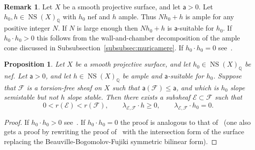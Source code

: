 \documentclass[11pt]{amsart}
\newcommand{\QQ}{{\mathbb Q}}
\let\mathcal\mathscr
\def\cE{\mathcal{E}}
\def\cF{\mathcal{F}}
\DeclareMathOperator{\NS}{NS}
\newtheorem{prp}[lmm]{Proposition}
\theoremstyle{definition}
\newtheorem{rmk}[lmm]{Remark}
\theoremstyle{remark}
\begin{document}
%
\begin{rmk}\label{rmk:fratelli}
%
   Let $X$ be a smooth projective surface, and let ${\mathsf a}> 0$. 
Let $h_0,h\in\NS(X)_{\QQ}$ with $h_0$ nef and $h$ ample. Thus $Nh_0+h$ is ample for any positive integer $N$. 
If $N$ is large enough  then $Nh_0+h$ is ${\mathsf a}$-suitable for $h_0$.  If $h_0\cdot h_0>0$ this follows from the wall-and-chamber decomposition of the ample cone 
 discussed in Subsubsection~\ref{subsubsec:muricamere}. If $h_0\cdot h_0=0$ see~\cite[Lemma~2.3]{friedman-rk2-ell}.
%
\end{rmk}
%
%
\begin{prp}\label{prp:paragonestab}
%
Let $X$ be a smooth projective surface, and let  $h_0\in\NS(X)_{\QQ}$ be  nef. 
Let  ${\mathsf a}> 0$, and let $h\in\NS(X)_{\QQ}$  be  ample and ${\mathsf a}$-suitable for $h_0$. 
 Suppose that  $\cF$ is  a torsion-free  sheaf on $X$ such that  
   ${\mathsf a}(\cF)\le {\mathsf a}$, and   which  is
  $h_0$ slope semistable  but not $h$ slope stable.  
    Then there exists a subsheaf  $\cE\subset \cF$ such that 
%
\begin{equation}
%
0<r(\cE)<r(\cF),\qquad \lambda_{\cE,\cF}\cdot h\ge 0,\qquad \lambda_{\cE,\cF}\cdot h_0= 0.
%
\end{equation}
%
\end{prp}
%
%
\begin{proof}
%
If $h_0\cdot h_0>0$ see~\cite[Thm~4.C.3]{huy-lehn:librofasci}. If $h_0\cdot h_0=0$ the proof is analogous to that of~\cite[Thm~3.3]{friedman-so(3)-invrnts} (one also gets a proof by rewriting  the proof of~\cite[Prop.~5.9]{og:highdim} with the intersection form of the surface 
 replacing the Beauville-Bogomolov-Fujiki symmetric bilinear form). 
%
\end{proof}
%
%
\end{document}
